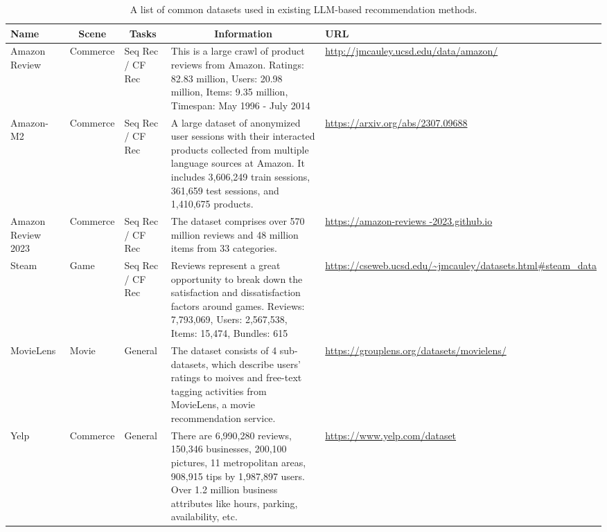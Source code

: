 \documentclass[sn-mathphys-num]{sn-jnl}%
\theoremstyle{thmstyleone}%
\theoremstyle{thmstyletwo}%
\theoremstyle{thmstylethree}%
\begin{document}
\linespread{1.05}
\begin{table}[!ht]
\footnotesize
    \centering
    \caption{A list of common datasets used in existing LLM-based recommendation methods.}
    \begin{tabular}{m{1.1cm}<{\centering}|m{1.15cm}|m{1.15cm}|m{4.9cm}|m{2.2cm}}
        \hline
        Name  &  \multicolumn{1}{c|}{Scene}  & \multicolumn{1}{c|}{Tasks} &  \multicolumn{1}{c|}{Information} & URL \\
        \hline
        Amazon Review \cite{he2016ups} & Commerce  & Seq Rec / CF Rec & This is a large crawl of product reviews from Amazon. Ratings: 82.83 million, Users:	20.98 million, Items: 9.35 million, Timespan: May 1996 - July 2014 &  \url{http://jmcauley.ucsd.edu/data/amazon/}  \\ 
        \hline
        Amazon-M2~\cite{jin2023amazon} & Commerce  & Seq Rec / CF Rec & A large dataset of anonymized user sessions with their interacted products collected from multiple language sources at Amazon. It includes 3,606,249 train sessions, 361,659 test sessions, and 1,410,675 products. &  \url{https://arxiv.org/abs/2307.09688}  \\ 
        \hline
        Amazon Review 2023~\cite{DBLP:journals/corr/abs-2403-03952} & Commerce  & Seq Rec / CF Rec & The dataset comprises over 570 million reviews and 48 million items from 33 categories. & \href{https://amazon-reviews-2023.github.io}{https://amazon-reviews -2023.github.io}  \\ 
        \hline
        Steam \cite{wan2018item} & Game  & Seq Rec / CF Rec & Reviews represent a great opportunity to break down the satisfaction and dissatisfaction factors around games. Reviews: 7,793,069, Users:	2,567,538, Items: 15,474, Bundles: 615 &  \url{https://cseweb.ucsd.edu/~jmcauley/datasets.html#steam_data}  \\ 
        \hline
        MovieLens & Movie  & General & The dataset consists of 4 sub-datasets, which describe users' ratings to moives and free-text tagging activities from MovieLens, a movie recommendation service.  &  \url{https://grouplens.org/datasets/movielens/}  \\ 
        \hline
        Yelp & Commerce  & General & There are 6,990,280 reviews, 150,346 businesses, 200,100 pictures, 11 metropolitan areas, 908,915 tips by 1,987,897 users. 
Over 1.2 million business attributes like hours, parking, availability, etc. &  \url{https://www.yelp.com/dataset}  \\ 
        \hline

\end{tabular}
\end{table}
\end{document}
